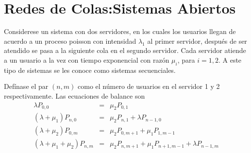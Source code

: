 \documentclass{article}
\begin{document}
%
\section{Redes de Colas:Sistemas Abiertos}

Considerese un sistema con dos servidores, en los cuales los usuarios llegan de acuerdo a un proceso poisson con intensidad $\lambda_{1}$ al primer servidor, despu\'es de ser atendido se pasa a la siguiente cola en el segundo servidor. Cada servidor atiende a un usuario a la vez con tiempo exponencial con raz\'on $\mu_{i}$, para $i=1,2$. A este tipo de sistemas se les conoce como sistemas secuenciales.

Def\'inase el par $\left(n,m\right)$ como el n\'umero de usuarios en el servidor 1 y 2 respectivamente. Las ecuaciones de balance son
\begin{eqnarray}\label{Eq.Balance}
\lambda P_{0,0}&=&\mu_{2}P_{0,1}\\
\left(\lambda+\mu_{1}\right)P_{n,0}&=&\mu_{2}P_{n,1}+\lambda P_{n-1,0}\\
\left(\lambda+\mu_{2}\right)P_{0,m}&=&\mu_{2}P_{0,m+1}+\mu_{1}P_{1,m-1}\\
\left(\lambda+\mu_{1}+\mu_{2}\right)P_{n,m}&=&\mu_{2}P_{n,m+1}+\mu_{1}P_{n+1,m-1}+\lambda
P_{n-1,m}
\end{eqnarray}
\end{document}
